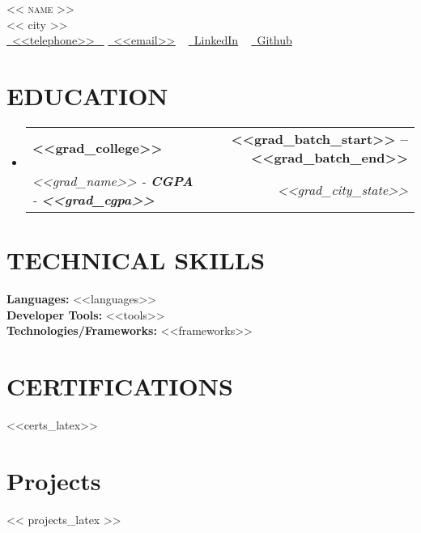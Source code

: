 \documentclass[letterpaper,11pt]{article}
\makeatletter
\newcommand{\resumeSubheading}[4]{
  \vspace{-2pt}\item
    \begin{tabular*}{1.0\textwidth}[t]{l@{\extracolsep{\fill}}r}
      \textbf{\large#1} & \textbf{\small #2} \\
      \textit{\large#3} & \textit{\small #4} \\
     
    \end{tabular*}\vspace{-7pt}
}
\newcommand{\resumeSubHeadingListStart}{\begin{itemize}[leftmargin=0.0in, label={}]}
\newcommand{\resumeSubHeadingListEnd}{\end{itemize}}
\makeatother
\begin{document}

\begin{center}
    {\Huge \scshape << name >>} \\ \vspace{1pt}
    << city >> \\ \vspace{1pt}
    \small 
    \small \href{<<telephone>>}{ \raisebox{-0.1\height}\faPhone\ \underline{<<telephone>>} ~} 
    \href{<<email>>}{\raisebox{-0.2\height}\faEnvelope\  \underline{<<email>>}} ~
    \href{<<linkedin>>}{\raisebox{-0.2\height}\faLinkedinSquare\ \underline{LinkedIn}}  ~
    \href{<<github>>}{\raisebox{-0.2\height}\faGithub\ \underline{Github}} ~
\end{center}

\section{EDUCATION}
  \resumeSubHeadingListStart
    \resumeSubheading
      {<<grad_college>>}{<<grad_batch_start>> -- <<grad_batch_end>>}
      {<<grad_name>> - \textbf{CGPA} - \textbf{<<grad_cgpa>>} }{<<grad_city_state>>}
  \resumeSubHeadingListEnd
\section{TECHNICAL SKILLS}
 \begin{itemize}[leftmargin=0.15in, label={}]
    \small{\item{
     \textbf{\normalsize{Languages:}}{ \normalsize{<<languages>>}} \\
     \textbf{\normalsize{Developer Tools:}}{ \normalsize{<<tools>>}} \\
     \textbf{\normalsize{Technologies/Frameworks:}}{\normalsize{ <<frameworks>>}} \\
    }}
 \end{itemize}
 \vspace{-15pt}



\section{CERTIFICATIONS}
<<certs_latex>>

\section*{Projects}
<< projects_latex >>
\end{document}
